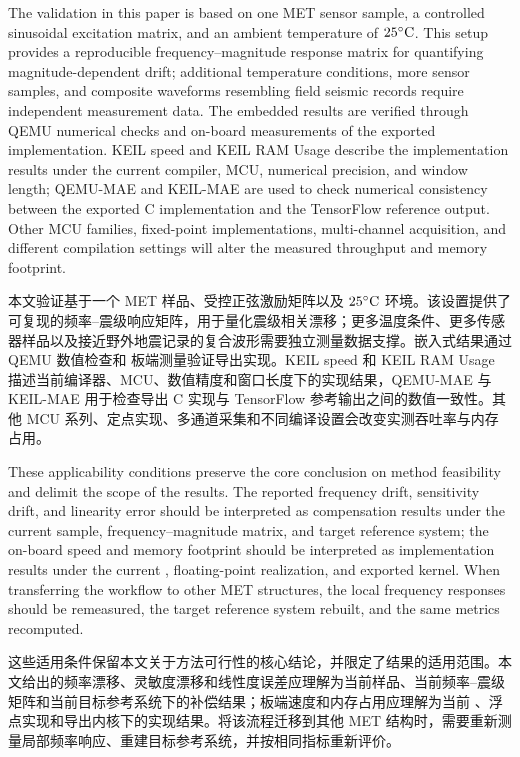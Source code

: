 \documentclass[sn-nature]{sn-jnl}
\newif\ifCNENEnglish
\newif\ifCNENBilingual
\newcommand{\CNEN}[2]{%
    \ifCNENBilingual
        #1%
        \if\relax\detokenize{#2}\relax\else\par #2\fi%
    \else
        \ifCNENEnglish
            #2%
        \else
            #1%
        \fi
    \fi
}
\begin{document}
\CNEN{本文验证基于一个 MET 样品、受控正弦激励矩阵以及 $25^\circ\text{C}$ 环境。该设置提供了可复现的频率--震级响应矩阵，用于量化震级相关漂移；更多温度条件、更多传感器样品以及接近野外地震记录的复合波形需要独立测量数据支撑。嵌入式结果通过 QEMU 数值检查和 \valTargetMcu{} 板端测量验证导出实现。KEIL speed 和 KEIL RAM Usage 描述当前编译器、MCU、数值精度和窗口长度下的实现结果，QEMU-MAE 与 KEIL-MAE 用于检查导出 C 实现与 TensorFlow 参考输出之间的数值一致性。其他 MCU 系列、定点实现、多通道采集和不同编译设置会改变实测吞吐率与内存占用。}{The validation in this paper is based on one MET sensor sample, a controlled sinusoidal excitation matrix, and an ambient temperature of $25^\circ\text{C}$. This setup provides a reproducible frequency--magnitude response matrix for quantifying magnitude-dependent drift; additional temperature conditions, more sensor samples, and composite waveforms resembling field seismic records require independent measurement data. The embedded results are verified through QEMU numerical checks and \valTargetMcu{} on-board measurements of the exported implementation. KEIL speed and KEIL RAM Usage describe the implementation results under the current compiler, MCU, numerical precision, and window length; QEMU-MAE and KEIL-MAE are used to check numerical consistency between the exported C implementation and the TensorFlow reference output. Other MCU families, fixed-point implementations, multi-channel acquisition, and different compilation settings will alter the measured throughput and memory footprint.%
}

\CNEN{这些适用条件保留本文关于方法可行性的核心结论，并限定了结果的适用范围。本文给出的频率漂移、灵敏度漂移和线性度误差应理解为当前样品、当前频率--震级矩阵和当前目标参考系统下的补偿结果；板端速度和内存占用应理解为当前 \valTargetMcu{}、浮点实现和导出内核下的实现结果。将该流程迁移到其他 MET 结构时，需要重新测量局部频率响应、重建目标参考系统，并按相同指标重新评价。}{These applicability conditions preserve the core conclusion on method feasibility and delimit the scope of the results. The reported frequency drift, sensitivity drift, and linearity error should be interpreted as compensation results under the current sample, frequency--magnitude matrix, and target reference system; the on-board speed and memory footprint should be interpreted as implementation results under the current \valTargetMcu{}, floating-point realization, and exported kernel. When transferring the workflow to other MET structures, the local frequency responses should be remeasured, the target reference system rebuilt, and the same metrics recomputed.}
\end{document}
